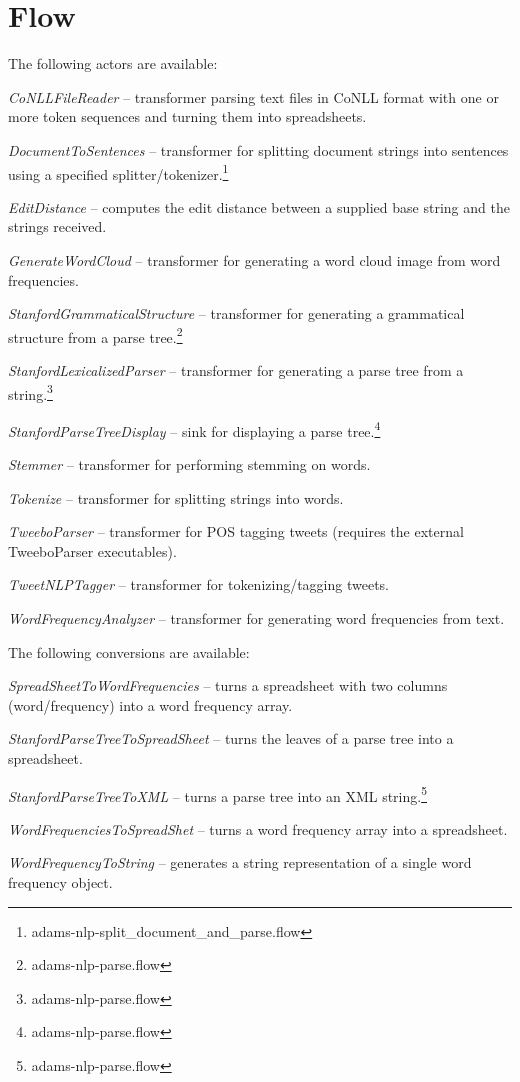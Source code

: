 \documentclass[a4paper]{book}
\begin{document}
\chapter{Flow}
The following actors are available:
\begin{tight_itemize}
	\item \textit{CoNLLFileReader} -- transformer parsing text files in
	CoNLL format with one or more token sequences and turning them into
	spreadsheets.
	\item \textit{DocumentToSentences} -- transformer for splitting document
	strings into sentences using a specified
	splitter/tokenizer.\footnote{adams-nlp-split\_document\_and\_parse.flow}
	\item \textit{EditDistance} -- computes the edit distance between
	a supplied base string and the strings received.
	\item \textit{GenerateWordCloud} -- transformer for generating a word
	cloud image from word frequencies.
	\item \textit{StanfordGrammaticalStructure} -- transformer for generating a
	grammatical structure from a parse tree.\footnote{adams-nlp-parse.flow}
	\item \textit{StanfordLexicalizedParser} -- transformer for generating a 
	parse tree from a string.\footnote{adams-nlp-parse.flow}
	\item \textit{StanfordParseTreeDisplay} -- sink for displaying a parse 
	tree.\footnote{adams-nlp-parse.flow}
	\item \textit{Stemmer} -- transformer for performing stemming on words.
	\item \textit{Tokenize} -- transformer for splitting strings
	into words.
	\item \textit{TweeboParser} -- transformer for POS tagging tweets
	(requires the external TweeboParser executables).
	\item \textit{TweetNLPTagger} -- transformer for tokenizing/tagging
	tweets.
	\item \textit{WordFrequencyAnalyzer} -- transformer for generating word
	frequencies from text.
\end{tight_itemize}
The following conversions are available:
\begin{tight_itemize}
   	\item \textit{SpreadSheetToWordFrequencies} -- turns a spreadsheet
   	with two columns (word/frequency) into a word frequency array.
   	\item \textit{StanfordParseTreeToSpreadSheet} -- turns the leaves of a
   	parse tree into a spreadsheet.
	\item \textit{StanfordParseTreeToXML} -- turns a parse tree into an
	XML string.\footnote{adams-nlp-parse.flow}
   	\item \textit{WordFrequenciesToSpreadShet} -- turns a word frequency
   	array into a spreadsheet.
   	\item \textit{WordFrequencyToString} -- generates a string representation
   	of a single word frequency object.
\end{tight_itemize}
\end{document}
